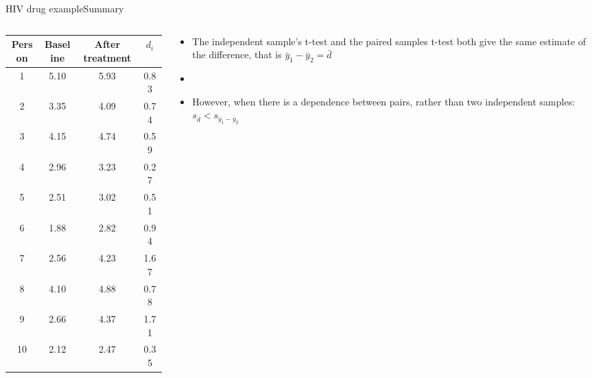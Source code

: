 \documentclass[xcolor=dvipsnames]{beamer}
\begin{document}
\begin{frame}{HIV drug example}{Summary}
\begin{columns}
	\begin{column}{.4 \textwidth}
		{\tiny
			\begin{tabular}{|c|c|c|c|}
				\hline
				\textbf{Person} & \textbf{Baseline} &  \textbf{After treatment} & $d_i$ \\ \hline \hline
				1  &    5.10 &   5.93 &  0.83 \\ \hline 
				2  &    3.35 &   4.09 &  0.74 \\ \hline 
				3  &   4.15  &  4.74 &  0.59 \\ \hline 
				4  &   2.96  &  3.23 &  0.27 \\ \hline 
				5  &    2.51 &   3.02 &  0.51 \\ \hline 
				6  &   1.88  &  2.82 &  0.94 \\ \hline 
				7  &   2.56  &  4.23 &  1.67 \\ \hline 
				8  &    4.10 &   4.88 &  0.78 \\ \hline 
				9  &   2.66  &  4.37 &  1.71 \\ \hline 
				10  &    2.12  &  2.47 &  0.35 \\ \hline 
			\end{tabular}
		}
	\end{column}
	\begin{column}{.6 \textwidth}
		\begin{itemize}
			\item The independent sample's t-test and the paired samples t-test both give the same estimate of the difference, that is $\bar{y}_1-\bar{y}_2 = \bar{d}$
			\item[]
			\item However, when there is a dependence between pairs, rather than two independent samples: $s_{\bar{d}} < s_{\bar{y}_1 - \bar{y}_2}$ 
		\end{itemize}
	\end{column}
\end{columns}
\end{frame}
\end{document}
